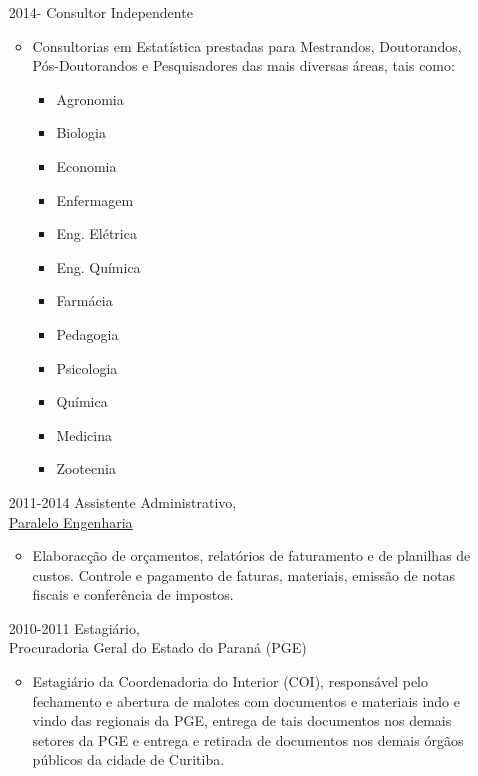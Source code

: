 \documentclass[12pt]{article}
\begin{document}
\begin{itemize}
 \item[2014-] Consultor Independente
  \begin{itemize}
   \item Consultorias em Estat\'{i}stica prestadas para Mestrandos,
         Doutorandos, P\'{o}s-Doutorandos e Pesquisadores das mais
         diversas \'{a}reas, tais como:
    \begin{multicols}{4}
      \begin{itemize}
      \item Agronomia
      \item Biologia
      \item Economia
      \item Enfermagem
      \item Eng. El\'{e}trica
      \item Eng. Qu\'{i}mica
      \item Farm\'{a}cia
      \item Pedagogia
      \item Psicologia
      \item Qu\'{i}mica
      \item Medicina
      \item Zootecnia
     \end{itemize}
    \end{multicols}
  \end{itemize}
\end{itemize}

\begin{itemize}
 \item[2011-2014] Assistente Administrativo,\\
                  \href{https://paralelo.eng.br/}{\color{blue}Paralelo Engenharia}
  \begin{itemize}
   \item Elaborac\c{c}\~{a}o de or\c{c}amentos, relat\'{o}rios de
         faturamento e de planilhas de custos. Controle e pagamento de
         faturas, materiais, emiss\~{a}o de notas fiscais e
         confer\^{e}ncia de impostos.
  \end{itemize}

 \item[2010-2011] Estagi\'{a}rio,\\
                  Procuradoria Geral do Estado do Paran\'{a} (PGE)
  \begin{itemize}
   \item Estagi\'{a}rio da Coordenadoria do Interior (COI),
         respons\'{a}vel pelo fechamento e abertura de malotes com
         documentos e materiais indo e vindo das regionais da PGE,
         entrega de tais documentos nos demais setores da PGE e entrega
         e retirada de documentos nos demais \'{o}rg\~{a}os p\'{u}blicos
         da cidade de Curitiba.
  \end{itemize}
\end{itemize}
\end{document}
